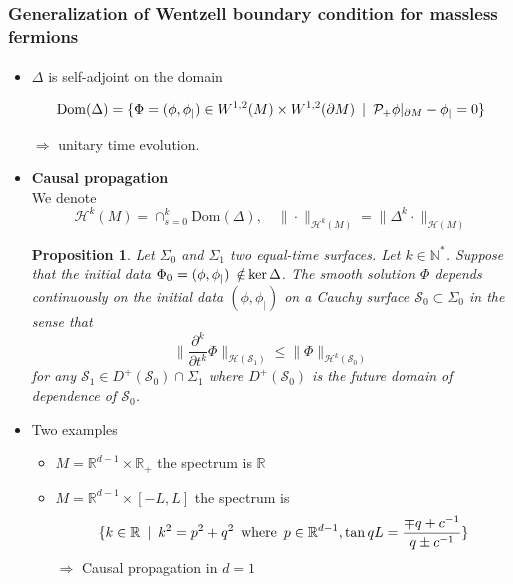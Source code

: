 \documentclass[english]{beamer}
\newcommand{\dom}{\mathrm{Dom}}
\newtheorem{proposition}{Proposition}
\begin{document}
\begin{frame}[shrink=30]
\frametitle{\small{Generalization of Wentzell boundary condition for massless fermions}}
\framesubtitle{}

\begin{itemize}

\item<1-> $\Delta$ is self-adjoint on the domain

\begin{equation*}
\dom( \Delta) = \{ \Phi = (\phi, \phi_|) \in W^{1,2}(M)\times W^{1,2}(
\partial M) \enskip | \enskip \mathcal{P}_+\phi \vert_{\partial M} - \phi_| = 0 \} 
\end{equation*}  

$\Rightarrow$ unitary time evolution.
\newline

\item<2-> \textbf{Causal propagation}\\
We denote
\begin{equation*}
\mathcal{H}^k(M) = \cap_{s=0}^{k} \dom(\Delta), 
\quad
\| \cdot \|_{\mathcal{H}^k(M)} = \| \Delta^k \cdot \|_{\mathcal{H}(M)}
\end{equation*}

\begin{proposition}
Let $\Sigma_0$ and $\Sigma_1$ two equal-time surfaces.
Let $k \in \mathbb{N}^*$.
Suppose that the initial data $\Phi_0 = (\phi, \phi_|)\enskip\slashed{\in} \ker \Delta$.
The smooth solution $\Phi$ depends continuously on the initial data $(\phi, \phi_|)$ on a Cauchy surface $\mathcal{S}_0 \subset \Sigma_0$ in the sense that
\begin{equation*}
\big\| \frac{\partial^k}{\partial t^k} \Phi\big\|_{\mathcal{H}(\mathcal{S}_1)}
\leq
\big\| \Phi\big\|_{\mathcal{H}^{k}(\mathcal{S}_0)}
\end{equation*}
for any $\mathcal{S}_1 \in D^+(\mathcal{S}_0)\cap\Sigma_1$
where $D^+(\mathcal{S}_0)$ is the future domain of dependence of $\mathcal{S}_0$.
\end{proposition}

\item<3-> Two examples 

	\begin{itemize}
		\item<4-> $M = \mathbb{R}^{d-1}\times \mathbb{R}_+$ the spectrum is $\mathbb{R}$
		\item<5-> $M = \mathbb{R}^{d-1}\times [-L, L]$ the spectrum is
		\begin{equation*}
		\{k\in\mathbb{R} \enskip\vert\enskip k^2 = p^2 + q^2 \enskip\mathrm{ where }\enskip p\in\mathbb{R}^{d-1}, \tan q L = \frac{\mp q + c^{-1}}{q \pm c^{-1}}\}
		\end{equation*}
		$\Rightarrow$ Causal propagation in $d=1$
	\end{itemize}
\end{itemize}

\end{frame}
\end{document}
